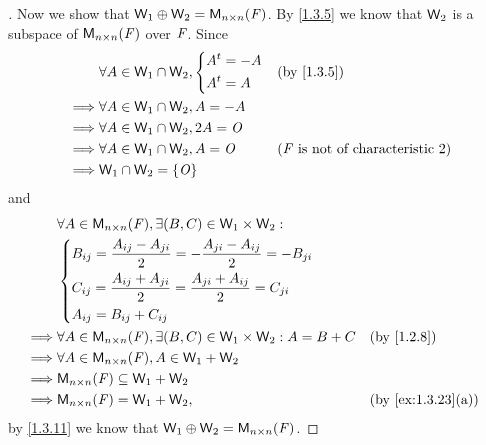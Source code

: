 \begin{proof}[]
	Now we show that \(\W_1 \oplus \W_2 = \ms[n][n][\F]\).
	By \cref{1.3.5} we know that \(\mathsf{W}_2\) is a subspace of \(\ms[n][n][\F]\) over \(\mathit{F}\).
	Since
	\begin{align*}
		         & \forall A \in \W_1 \cap \W_2, \begin{dcases}
			                                         \tp{A} = -A \\
			                                         \tp{A} = A
		                                         \end{dcases} &  & \by{1.3.5}                                       \\
		\implies & \forall A \in \W_1 \cap \W_2, A = -A                                                             \\
		\implies & \forall A \in \W_1 \cap \W_2, 2A = \zm                                                           \\
		\implies & \forall A \in \W_1 \cap \W_2, A = \zm        &  & \text{(\(\F\) is not of characteristic \(2\))} \\
		\implies & \W_1 \cap \W_2 = \set{\zm}
	\end{align*}
	and
	\begin{align*}
		         & \forall A \in \ms[n][n][\F], \exists (B, C) \in \W_1 \times \W_2 :                                                                                                                                     \\
		         & \begin{dcases}
			           B_{i j} = \frac{A_{i j} - A_{j i}}{2} = - \frac{A_{j i} - A_{i j}}{2} = -B_{j i} \\
			           C_{i j} = \frac{A_{i j} + A_{j i}}{2} = \frac{A_{j i} + A_{i j}}{2} = C_{j i}    \\
			           A_{i j} = B_{i j} + C_{i j}
		           \end{dcases}                           \\
		\implies & \forall A \in \ms[n][n][\F], \exists (B, C) \in \W_1 \times \W_2 : A = B + C                                                                                                    &  & \by{1.2.8}        \\
		\implies & \forall A \in \ms[n][n][\F], A \in \W_1 + \W_2                                                                                                                                                         \\
		\implies & \ms[n][n][\F] \subseteq \W_1 + \W_2                                                                                                                                                                    \\
		\implies & \ms[n][n][\F] = \W_1 + \W_2,                                                                                                                                                    &  & \by{ex:1.3.23}[a]
	\end{align*}
	by \cref{1.3.11} we know that \(\W_1 \oplus \W_2 = \ms[n][n][\F]\).
\end{proof}

